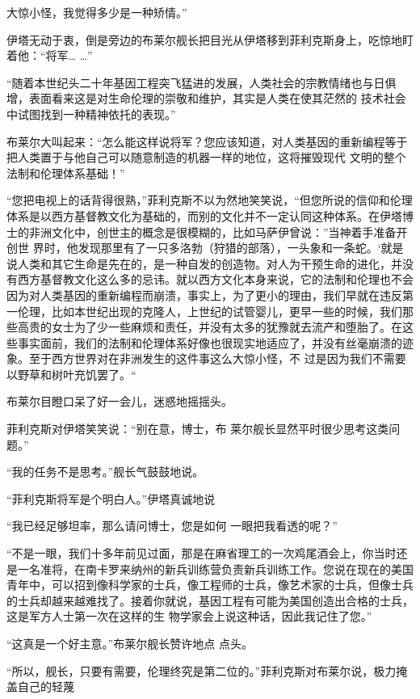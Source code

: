 \documentclass{article}
\begin{document}
大惊小怪，我觉得多少是一种矫情。” 

伊塔无动于衷，倒是旁边的布莱尔舰长把目光从伊塔移到菲利克斯身上，吃惊地盯着他：“将军…
…” 

“随着本世纪头二十年基因工程突飞猛进的发展，人类社会的宗教情绪也与日俱增，表面看来这是对生命伦理的崇敬和维护，其实是人类在使其茫然的
技术社会中试图找到一种精神依托的表现。” 

布莱尔大叫起来：“怎么能这样说将军？您应该知道，对人类基因的重新编程等于把人类置于与他自己可以随意制造的机器一样的地位，这将摧毁现代
文明的整个法制和伦理体系基础！” 

“您把电视上的话背得很熟，”菲利克斯不以为然地笑笑说，“但您所说的信仰和伦理体系是以西方基督教文化为基础的，而别的文化并不一定认同这种体系。在伊塔博士的非洲文化中，创世主的概念是很模糊的，比如马萨伊曾说：”当神着手准备开创世
\newpage
界时，他发现那里有了一只多洛勃（狩猎的部落），一头象和一条蛇。‘就是说人类和其它生命是先在的，是一种自发的创造物。对人为干预生命的进化，并没有西方基督教文化这么多的忌讳。就以西方文化本身来说，它的法制和伦理也不会因为对人类基因的重新编程而崩溃，事实上，为了更小的理由，我们早就在违反第一伦理，比如本世纪出现的克隆人，上世纪的试管婴儿，更早一些的时候，我们那些高贵的女士为了少一些麻烦和责任，并没有太多的犹豫就去流产和堕胎了。在这些事实面前，我们的法制和伦理体系好像也很现实地适应了，并没有丝毫崩溃的迹象。至于西方世界对在非洲发生的这件事这么大惊小怪，不
过是因为我们不需要以野草和树叶充饥罢了。“ 

布莱尔目瞪口呆了好一会儿，迷惑地摇摇头。

菲利克斯对伊塔笑笑说：“别在意，博士，布
莱尔舰长显然平时很少思考这类问题。” 


“我的任务不是思考。”舰长气鼓鼓地说。 

\newpage

“菲利克斯将军是个明白人。”伊塔真诚地说

“我已经足够坦率，那么请问博士，您是如何
一眼把我看透的呢？” 

“不是一眼，我们十多年前见过面，那是在麻省理工的一次鸡尾酒会上，你当时还是一名准将，在南卡罗来纳州的新兵训练营负责新兵训练工作。您说在现在的美国青年中，可以招到像科学家的士兵，像工程师的士兵，像艺术家的士兵，但像士兵的士兵却越来越难找了。接着你就说，基因工程有可能为美国创造出合格的士兵，这是军方人士第一次在这样的生
物学家会上说这种话，因此我记住了您。” 

“这真是一个好主意。”布莱尔舰长赞许地点
点头。 

“所以，舰长，只要有需要，伦理终究是第二位的。”菲利克斯对布莱尔说，极力掩盖自己的轻蔑
\end{document}
